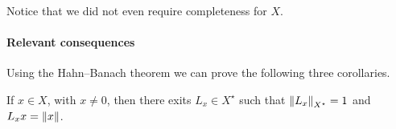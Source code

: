 Notice that we did not even require completeness for $X$.

% 

% 	

%	
%	
%	

\paragraph{Relevant consequences} Using the Hahn--Banach theorem we can prove the following three corollaries.

\begin{coro} \label{prop-conseq-HB-1}
	If $x \in X$, with $x\neq 0$, then there exits $L_x \in X^\star$ such that $\left\lVert L_x\right\rVert_{X^\star} = 1$ and $L_xx = \left\lVert x\right\rVert$.
\end{coro}

